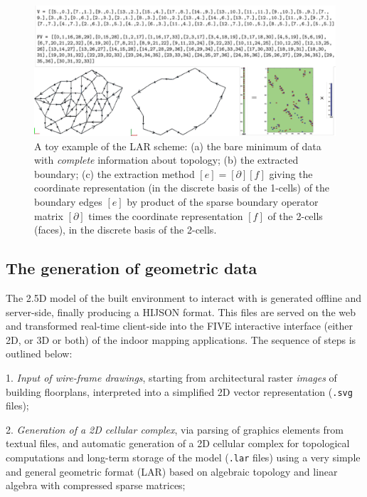 \begin{figure}[ptb] %
 \centering
 \includegraphics[width=\linewidth]{images/minimum} 
 \caption{A toy example of the LAR scheme: (a) the bare minimum of data with \emph{complete} information about topology; (b) the extracted boundary; (c) the extraction method $[e] = [\partial][f]$ giving the coordinate representation (in the discrete basis of the 1-cells) of the boundary edges $[e]$ by product of the sparse boundary operator matrix $[\partial]$ times the coordinate representation $[f]$ of the 2-cells (faces), in the discrete basis of the 2-cells.}
 \label{fig:minimum}
\end{figure}

\subsection{The generation of geometric data}

The 2.5D model of the built environment to interact with is generated offline and server-side, finally producing a HIJSON format. This  files are served on the web and transformed real-time client-side into the FIVE interactive interface (either 2D, or 3D or both) of the indoor mapping applications. The sequence of steps is outlined below:

1. \textit{Input of wire-frame drawings},
  starting from architectural  raster \emph{images} of building floorplans, interpreted into a simplified 2D vector representation (\texttt{.svg} files);

2. \textit{Generation of a 2D cellular complex}, via
  parsing of graphics elements from textual files, and automatic generation of a 2D cellular complex for topological computations and long-term storage of the model (\texttt{.lar} files) using a very simple and general geometric format (LAR) based on algebraic topology and linear algebra with compressed sparse matrices;

